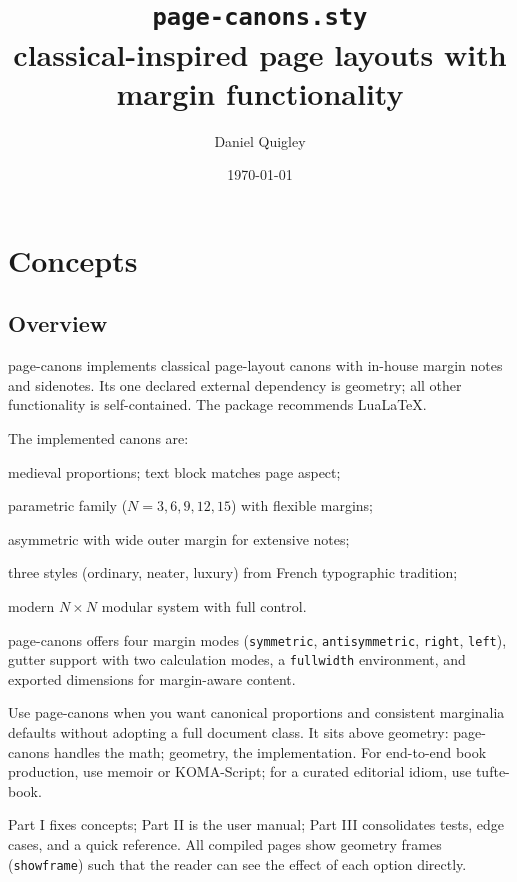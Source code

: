 \documentclass[11pt, twoside, openany]{book}
\title{\texttt{page-canons.sty}\\[0.5\baselineskip]
  \large classical-inspired page layouts with margin functionality}
\author{Daniel Quigley}
\date{\today}
\makeatletter
\newcommand{\pkg}[1]{\textsf{#1}}
\newenvironment{widedesc}[1][12em]{%
  \list{}{%
    \labelwidth=#1\relax
    \labelsep=0.5em\relax
    \leftmargin=\labelwidth \advance\leftmargin\labelsep
    \itemindent=\z@
    \def\makelabel##1{\normalfont\bfseries ##1\hfil}%
  }%
}{\endlist}
\makeatother
\begin{document}
\maketitle
\tableofcontents


\part{Concepts}\label{part:concepts}


\chapter{Overview}\label{chapter:overview}

\pkg{page-canons} implements classical page-layout canons with in-house margin notes and sidenotes. Its one declared external dependency is \pkg{geometry}; all other functionality is self-contained. The package recommends Lua\LaTeX.

The implemented canons are:
\begin{widedesc}[12em]
	\item[Van de Graaf] medieval proportions; text block matches page aspect;
	\item[Villard de Honnecourt] parametric family ($N=3,6,9,12,15$) with flexible margins;
	\item[Tufte] asymmetric with wide outer margin for extensive notes;
	\item[Canon des Ateliers] three styles (ordinary, neater, luxury) from French typographic tradition;
	\item[Grid] modern $N\times N$ modular system with full control.
\end{widedesc}

\pkg{page-canons} offers four margin modes (\texttt{symmetric}, \texttt{antisymmetric}, \texttt{right}, \texttt{left}), gutter support with two calculation modes, a \texttt{fullwidth} environment, and exported dimensions for margin-aware content.

Use \pkg{page-canons} when you want canonical proportions and consistent marginalia defaults without adopting a full document class. It sits above \pkg{geometry}: \pkg{page-canons} handles the math; \pkg{geometry}, the implementation. For end-to-end book production, use \pkg{memoir} or KOMA-Script; for a curated editorial idiom, use \pkg{tufte-book}.

Part I fixes concepts; Part II is the user manual; Part III consolidates tests, edge cases, and a quick reference. All compiled pages show geometry frames (\texttt{showframe}) such that the reader can see the effect of each option directly.
\end{document}
